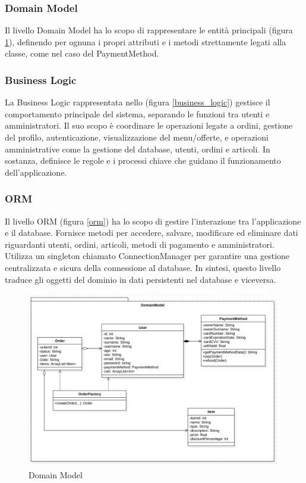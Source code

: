 \documentclass{article}
\begin{document}
\subsubsection{Domain Model}
Il livello Domain Model ha lo scopo di rappresentare le entità principali (figura \ref{domainModel}), definendo per ognuna i propri attributi e i metodi strettamente legati alla classe, come nel caso del PaymentMethod.

\subsubsection{Business Logic}
La Business Logic rappresentata nello (figura \ref{business_logic}) gestisce il comportamento principale del sistema, separando le funzioni tra utenti e amministratori. Il suo scopo è coordinare le operazioni legate a ordini, gestione del profilo, autenticazione, visualizzazione del menu/offerte, e operazioni amministrative come la gestione del database, utenti, ordini e articoli. In sostanza, definisce le regole e i processi chiave che guidano il funzionamento dell'applicazione.

\clearpage

\subsubsection{ORM}
Il livello ORM (figura \ref{orm}) ha lo scopo di gestire l’interazione tra l’applicazione e il database. Fornisce metodi per accedere, salvare, modificare ed eliminare dati riguardanti utenti, ordini, articoli, metodi di pagamento e amministratori. Utilizza un singleton chiamato ConnectionManager per garantire una gestione centralizzata e sicura della connessione al database. In sintesi, questo livello traduce gli oggetti del dominio in dati persistenti nel database e viceversa.


   \begin{figure}[h]
        \centering
        \includegraphics[width=1.0\textwidth]{imgs/DomainModel.png}
        \caption{Domain Model}
        \label{domainModel}
    \end{figure}
\end{document}
